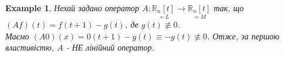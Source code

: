 \documentclass[a4paper, 10pt]{article}
\theoremstyle{theoremdd}
\newtheorem{example}[theorem]{Example}
\begin{document}
	\iffalse
	\begin{example}
	Нехай задано оператор $A: \underset{=L}{\mathbb{R}^2} \to \underset{=M}{\mathbb{R}^2}$.\\
	$\displaystyle A\vec{x} = \begin{pmatrix} x_1 + x_2 + 3 \\ x_1 -x_2 \end{pmatrix}$\\
	$A(\vec{0}) = \begin{pmatrix} 3 \\ 0 \end{pmatrix} \neq \vec{0}$.\\
	Отже, за другою властивістю, $A$ - НЕ лінійний оператор.
	\end{example}
	\fi
	
	\begin{example}
	Нехай задано оператор $A: \underset{=L}{\mathbb{R}_n[t]} \to \underset{=M}{\mathbb{R}_n[t]}$ так, що \\ $(Af)(t) = f(t+1) - g(t)$, де $g(t) \not\equiv 0$.\\
	Маємо $(A0)(x) = 0(t+1) - g(t) \equiv -g(t) \not\equiv 0$. Отже, за першою властивістю, $A$ - НЕ лінійний оператор.
	\end{example}
	
\end{document}
